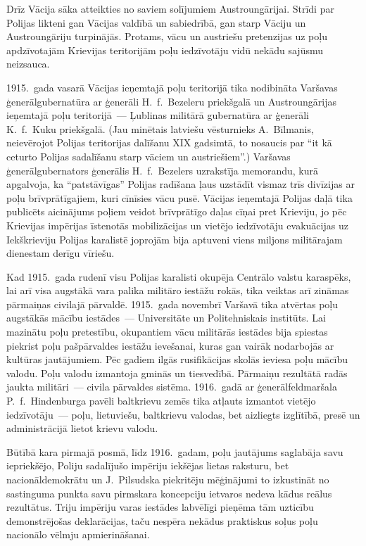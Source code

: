 \documentclass[twoside,a5paper,12pt,fleqn,openany]{extbook}
\begin{document}
Drīz Vācija sāka atteikties no saviem solījumiem Austroungārijai. Strīdi par Polijas likteni gan Vācijas valdībā un sabiedrībā, gan starp Vāciju un Austroungāriju turpinājās. Protams, vācu un austriešu pretenzijas uz poļu apdzīvotajām Krievijas teritorijām poļu iedzīvotāju vidū nekādu sajūsmu neizsauca.

1915.~gada vasarā Vācijas ieņemtajā poļu teritorijā tika nodibināta Varšavas ģenerālgubernatūra ar ģenerāli H.~f.~Bezeleru priekšgalā un Austroungārijas ieņemtajā poļu teritorijā~--- Ļublinas militārā gubernatūra ar ģenerāli K.~f.~Kuku priekšgalā. (Jau minētais latviešu vēsturnieks A.~Bīlmanis, neievērojot Polijas teritorijas dalīšanu XIX gadsimtā, to nosaucis par ``it kā ceturto Polijas sadalīšanu starp vāciem un austriešiem''.) Varšavas ģenerālgubernators ģenerālis H.~f.~Bezelers uzrakstīja memorandu, kurā apgalvoja, ka ``patstāvīgas'' Polijas radīšana ļaus uzstādīt vismaz trīs divīzijas ar poļu brīvprātīgajiem, kuri cīnīsies vācu pusē. Vācijas ieņemtajā Polijas daļā tika publicēts aicinājums poļiem veidot brīvprātīgo daļas cīņai pret Krieviju, jo pēc Krievijas impērijas īstenotās mobilizācijas un vietējo iedzīvotāju evakuācijas uz Iekškrieviju Polijas karalistē joprojām bija aptuveni viens miljons militārajam dienestam derīgu vīriešu.

Kad 1915.~gada rudenī visu Polijas karalisti okupēja Centrālo valstu karaspēks, lai arī visa augstākā vara palika militāro iestāžu rokās, tika veiktas arī zināmas pārmaiņas civilajā pārvaldē. 1915.~gada novembrī Varšavā tika atvērtas poļu augstākās mācību iestādes~--- Universitāte un Politehniskais institūts. Lai mazinātu poļu pretestību, okupantiem vācu militārās iestādes bija spiestas piekrist poļu pašpārvaldes iestāžu ievešanai, kuras gan vairāk nodarbojās ar kultūras jautājumiem. Pēc gadiem ilgās rusifikācijas skolās ieviesa poļu mācību valodu. Poļu valodu izmantoja gminās un tiesvedībā. Pārmaiņu rezultātā radās jaukta militāri~--- civila pārvaldes sistēma. 1916.~gadā ar ģenerālfeldmaršala P.~f.~Hindenburga pavēli baltkrievu zemēs tika atļauts izmantot vietējo iedzīvotāju~--- poļu, lietuviešu, baltkrievu valodas, bet aizliegts izglītībā, presē un administrācijā lietot krievu valodu.

Būtībā kara pirmajā posmā, līdz 1916.~gadam, poļu jautājums saglabāja savu iepriekšējo, Poliju sadalījušo impēriju iekšējas lietas raksturu, bet nacionāldemokrātu un J.~Pilsudska piekritēju mēģinājumi to izkustināt no sastinguma punkta savu pirmskara koncepciju ietvaros nedeva kādus reālus rezultātus. Triju impēriju varas iestādes labvēlīgi pieņēma tām uzticību demonstrējošas deklarācijas, taču nespēra nekādus praktiskus soļus poļu nacionālo vēlmju apmierināšanai.
\end{document}
